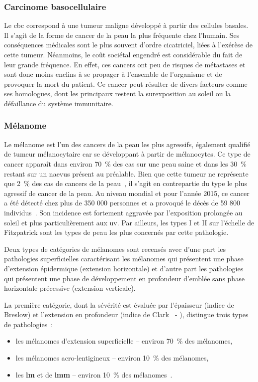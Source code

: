 \subsubsection{Carcinome basocellulaire}	
Le \gls{cbc} correspond à une tumeur maligne développé à partir des cellules basales. Il s’agit de la forme de cancer de la peau la plus fréquente chez l'humain. Ses conséquences médicales sont le plus souvent d'ordre cicatriciel, liées à l'exérèse de cette tumeur. Néanmoins, le coût sociétal engendré est considérable du fait de leur grande fréquence. En effet, ces cancers ont peu de risques de métastases et sont donc moins enclins à se propager à l’ensemble de l’organisme et de provoquer la mort du patient. Ce cancer peut résulter de divers facteurs comme ses homologues, dont les principaux restent la surexposition au soleil ou la défaillance du système immunitaire.\par

\subsubsection{Mélanome}
Le mélanome est l'un des cancers de la peau les plus agressifs, également qualifié de tumeur mélanocytaire car se développant à partir de mélanocytes. Ce type de cancer apparaît dans environ 70~\% des cas sur une peau saine et dans les 30~\% restant sur un naevus présent au préalable. Bien que cette tumeur ne représente que 2~\% des cas de cancers de la peau~\cite{Tortora2012}, il s’agit en contrepartie du type le plus agressif de cancer de la peau. Au niveau mondial et pour l'année 2015, ce cancer a été détecté chez plus de 350 000 personnes et a provoqué le décès de 59 800 individus~\cite{Karimkhani2017}. Son incidence est fortement aggravée par l’exposition prolongée au soleil et plus particulièrement aux \gls{uv}. Par ailleurs, les types I et II sur l’échelle de Fitzpatrick sont les types de peau les plus concernés par cette pathologie.\par

Deux types de catégories de mélanomes sont recensés avec d’une part les pathologies superficielles caractérisant les mélanomes qui présentent une phase d’extension épidermique (extension horizontale) et d'autre part les pathologies qui présentent une phase de développement en profondeur d’emblée sans phase horizontale précessive (extension verticale).\par

La première catégorie, dont la sévérité est évaluée par l'épaisseur (indice de Breslow) et l'extension en profondeur (indice de Clark~\cite{Clark1969} - ), distingue trois types de pathologies~:
\begin{itemize}
    \item les mélanomes d'extension superficielle – environ 70~\% des mélanomes,
    \item les mélanomes acro-lentigineux – environ 10~\% des mélanomes,
    \item les \textbf{\acrlong{lm}} et de \textbf{\acrlong{lmm}} – environ 10~\% des mélanomes~\cite{LeGal2011}.
\end{itemize}

